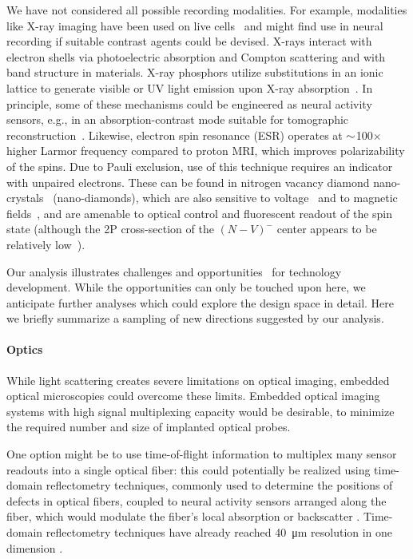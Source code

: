 We have not considered all possible recording modalities.
For example, modalities like X-ray imaging have been used on live cells~\cite{moosmann13} and might find use in neural recording if suitable contrast agents could be devised.
X-rays interact with electron shells via photoelectric absorption and Compton scattering and with band structure in materials.
X-ray phosphors utilize substitutions in an ionic lattice to generate visible or UV light emission upon X-ray absorption~\cite{issler95}.
In principle, some of these mechanisms could be engineered as neural activity sensors, e.g., in an absorption-contrast mode suitable for tomographic reconstruction~\cite{larabell04}. Likewise, electron spin resonance (ESR) operates at ${\sim}$100$\times$ higher Larmor frequency compared to proton MRI, which improves polarizability of the spins.
Due to Pauli exclusion, use of this technique requires an indicator with unpaired electrons. These can be found in nitrogen vacancy diamond nano-crystals~\cite{horowitz12} (nano-diamonds), which are also sensitive to voltage~\cite{dolde11} and to magnetic fields~\cite{Hall2012}, and are amenable to optical control and fluorescent readout of the spin state (although the 2P cross-section of the $(N-V)^-$ center appears to be relatively low~\cite{Tse-Luen2007}).

Our analysis illustrates challenges and opportunities~\cite{Dean2013} for technology development. While the opportunities can only be touched upon here, we anticipate further analyses which could explore the design space in detail. Here we briefly summarize a sampling of new directions suggested by our analysis.

\paragraph{Optics} While light scattering creates severe limitations on optical imaging, embedded optical microscopies could overcome these limits. Embedded optical imaging systems with high signal multiplexing capacity would be desirable, to minimize the required number and size of implanted optical probes. 

One option might be to use time-of-flight information to multiplex many sensor readouts into a single optical fiber: this could potentially be realized using time-domain reflectometry techniques, commonly used to determine the positions of defects in optical fibers, coupled to neural activity sensors arranged along the fiber, which would modulate the fiber's local absorption or backscatter \cite{WoodInPreparation}. Time-domain reflectometry techniques have already reached \SI{40}{\micro\meter} resolution in one dimension \cite{Lamy1981fi}.


